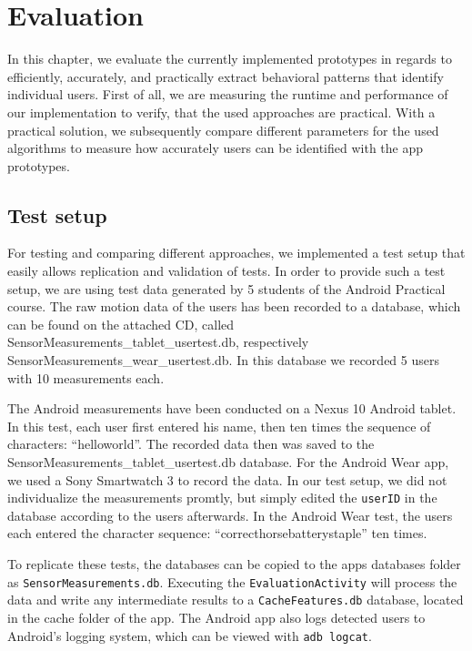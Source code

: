 \chapter{Evaluation}\label{chapter:evaluation}
In this chapter, we evaluate the currently implemented prototypes in regards to efficiently, accurately, and practically extract behavioral patterns that identify individual users. First of all, we are measuring the runtime and performance of our implementation to verify, that the used approaches are practical. With a practical solution, we subsequently compare different parameters for the used algorithms to measure how accurately users can be identified with the app prototypes.

\section{Test setup}
For testing and comparing different approaches, we implemented a test setup that easily allows replication and validation of tests. In order to provide such a test setup, we are using test data generated by 5 students of the Android Practical course. The raw motion data of the users has been recorded to a database, which can be found on the attached CD, called {\ttfamily Sensor\-Measurements\_\-tablet\_\-usertest.db}, respectively {\ttfamily Sensor\-Measurements\_\-wear\_\-usertest.db}. In this database we recorded 5 users with 10 measurements each.

The Android measurements have been conducted on a Nexus 10 Android tablet. In this test, each user first entered his name, then ten times the sequence of characters: ``helloworld''. The recorded data then was saved to the  {\ttfamily Sensor\-Measurements\_\-tablet\_\-usertest.db} database. For the Android Wear app, we used a Sony Smartwatch 3 to record the data. In our test setup, we did not individualize the measurements promtly, but simply edited the \lstinline$userID$ in the database according to the users afterwards. In the Android Wear test, the users each entered the character sequence: ``correcthorsebatterystaple'' ten times.

To replicate these tests, the databases can be copied to the apps databases folder as \lstinline$SensorMeasurements.db$. Executing the \lstinline$EvaluationActivity$ will process the data and write any intermediate results to a \lstinline$CacheFeatures.db$ database, located in the cache folder of the app. The Android app also logs detected users to Android's logging system, which can be viewed with \lstinline$adb logcat$.

